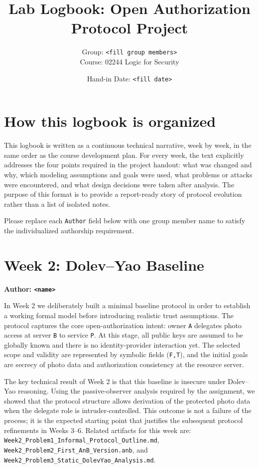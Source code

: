 \documentclass[11pt,a4paper]{article}
\title{Lab Logbook: Open Authorization Protocol Project}
\author{Group: \texttt{<fill group members>}\\Course: 02244 Logic for Security}
\date{Hand-in Date: \texttt{<fill date>}}
\begin{document}
\maketitle

\section*{How this logbook is organized}
This logbook is written as a continuous technical narrative, week by week, in the same order as the course development plan.
For every week, the text explicitly addresses the four points required in the project handout:
what was changed and why, which modeling assumptions and goals were used, what problems or attacks were encountered, and what design decisions were taken after analysis.
The purpose of this format is to provide a report-ready story of protocol evolution rather than a list of isolated notes.

Please replace each \texttt{Author} field below with one group member name to satisfy the individualized authorship requirement.

\section{Week 2: Dolev--Yao Baseline}
\textbf{Author: \texttt{<name>}}

In Week 2 we deliberately built a minimal baseline protocol in order to establish a working formal model before introducing realistic trust assumptions.
The protocol captures the core open-authorization intent: owner \texttt{A} delegates photo access at server \texttt{B} to service \texttt{P}.
At this stage, all public keys are assumed to be globally known and there is no identity-provider interaction yet.
The selected scope and validity are represented by symbolic fields (\texttt{F,T}), and the initial goals are secrecy of photo data and authorization consistency at the resource server.

The key technical result of Week 2 is that this baseline is insecure under Dolev--Yao reasoning.
Using the passive-observer analysis required by the assignment, we showed that the protocol structure allows derivation of the protected photo data when the delegate role is intruder-controlled.
This outcome is not a failure of the process; it is the expected starting point that justifies the subsequent protocol refinements in Weeks 3--6.
Related artifacts for this week are:
\texttt{Week2\_Problem1\_Informal\_Protocol\_Outline.md},
\texttt{Week2\_Problem2\_First\_AnB\_Version.anb},
and \texttt{Week2\_Problem3\_Static\_DolevYao\_Analysis.md}.
\end{document}
